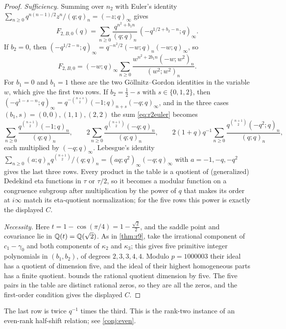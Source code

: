 \begin{proof}
\emph{Sufficiency.} Summing over $n_2$ with Euler's identity $\sum_{n\ge0}q^{n(n-1)/2}z^n/(q;q)_n=(-z;q)_\infty$ gives
\begin{equation}\label{eq:r2euler}
F_{2,B,0}(q)=\sum_{n\ge0}\frac{q^{n^2+b_1n}}{(q;q)_n}\,(-q^{1/2+b_2-n};q)_\infty .
\end{equation}
If $b_2=0$, then $(-q^{1/2-n};q)_\infty=q^{-n^2/2}(-w;q)_n(-w;q)_\infty$, so
\[
F_{2,B,0}=(-w;q)_\infty\sum_{n\ge0}\frac{w^{n^2+2b_1n}(-w;w^2)_n}{(w^2;w^2)_n}.
\] For $b_1=0$ and $b_1=1$ these are the two Göllnitz--Gordon identities \cite{Gordon65,Gollnitz67} in the variable $w$, which give the first two rows. If $b_2=\frac12-s$ with $s\in\{0,1,2\}$, then $(-q^{1-s-n};q)_\infty=q^{-\binom{n+s}2}(-1;q)_{n+s}(-q;q)_\infty$, and in the three cases $(b_1,s)=(0,0),(1,1),(2,2)$ the sum \eqref{eq:r2euler} becomes
\[
\sum_{n\ge0}\frac{q^{\binom{n+1}2}(-1;q)_n}{(q;q)_n},\qquad 2\sum_{n\ge0}\frac{q^{\binom{n+1}2}(-q;q)_n}{(q;q)_n},\qquad 2(1+q)q^{-1}\sum_{n\ge0}\frac{q^{\binom{n+1}2}(-q^2;q)_n}{(q;q)_n},
\]
each multiplied by $(-q;q)_\infty$. Lebesgue's identity $\sum_{n\ge0}(a;q)_nq^{\binom{n+1}2}/(q;q)_n=(aq;q^2)_\infty(-q;q)_\infty$ \cite{Andrews76} with $a=-1,-q,-q^2$ gives the last three rows. Every product in the table is a quotient of (generalized) Dedekind eta functions in $\tau$ or $\tau/2$, so it becomes a modular function on a congruence subgroup after multiplication by the power of $q$ that makes its order at $i\infty$ match its eta-quotient normalization; for the five rows this power is exactly the displayed $C$.

\emph{Necessity.} Here $t=1-\cos(\pi/4)=1-\frac{\sqrt2}2$, and the saddle point and covariance lie in $\mathbb{Q}(t)=\mathbb{Q}(\sqrt2)$. As in \cref{thm:r9}, take the irrational component of $c_1-\gamma_0$ and both components of $\kappa_2$ and $\kappa_3$; this gives five primitive integer polynomials in $(b_1,b_2)$, of degrees $2,3,3,4,4$. Modulo $p=1000003$ their ideal has a quotient of dimension five, and the ideal of their highest homogeneous parts has a finite quotient.  bounds the rational quotient dimension by five. The five pairs in the table are distinct rational zeros, so they are all the zeros, and the first-order condition gives the displayed $C$.
\end{proof}

The last row is twice $q^{-1}$ times the third. This is the rank-two instance of an even-rank half-shift relation; see \cref{conj:even}.

